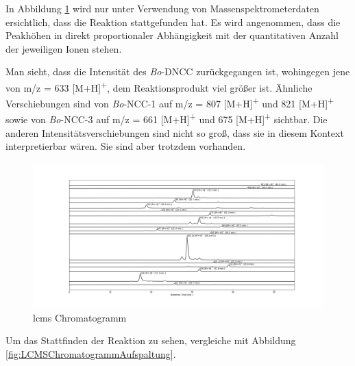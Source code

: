 In Abbildung \ref{fig:LCMSChromatogrammRPAufspaltung} wird nur unter Verwendung von Massenspektrometerdaten ersichtlich, dass die Reaktion stattgefunden hat. Es wird angenommen, dass die Peakhöhen in direkt proportionaler Abhängigkeit mit der quantitativen Anzahl der jeweiligen Ionen stehen.

Man sieht, dass die Intensität des \textit{Bo}-DNCC zurückgegangen ist, wohingegen jene von m/z = 633 [M+H]\textsuperscript{+}, dem Reaktionsprodukt viel größer ist. Ähnliche Verschiebungen sind von \textit{Bo}-NCC-1 auf m/z = 807 [M+H]\textsuperscript{+} und 821 [M+H]\textsuperscript{+} sowie von \textit{Bo}-NCC-3 auf m/z = 661 [M+H]\textsuperscript{+} und 675 [M+H]\textsuperscript{+} sichtbar. Die anderen Intensitätsverschiebungen sind nicht so groß, dass sie in diesem Kontext interpretierbar wären. Sie sind aber trotzdem vorhanden.

\begin{figure}[!htbp]
  \centering
  \includegraphics[width=1.4\textwidth, center]{figures/Kapitel6/Reaktion3h/Kuerbis_Analyse_Reaktion3h_LC-ESI-MS.png}
  \caption[LC-MS Chromatogramm nach 3 h Reaktionsdauer - Aufspaltung, Quelle: Autor]{\gls{lcms} Chromatogramm}
  \label{fig:LCMSChromatogrammRPAufspaltung}
\end{figure}

Um das Stattfinden der Reaktion zu sehen, vergleiche mit Abbildung \ref{fig:LCMSChromatogrammAufspaltung}.

